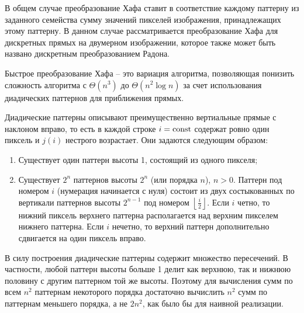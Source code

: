 

В общем случае преобразование Хафа ставит в соответствие каждому паттерну из заданного семейства сумму значений пикселей изображения, принадлежащих этому паттерну. В данном случае рассматривается преобразование Хафа для дискретных прямых на двумерном изображении, которое также может быть названо дискретным преобразованием Радона.

Быстрое преобразование Хафа -- это вариация алгоритма, позволяющая понизить сложность алгоритма с $\Theta(n^3)$ до $\Theta(n^2 \log n)$ за счет использования диадических паттернов для приближения прямых.

Диадические паттерны описывают преимущественно вертиальные прямые с наклоном вправо, то есть в каждой строке $i=\mathrm{const}$ содержат ровно один пиксель и $j(i)$ нестрого возрастает. Они задаются следующим образом:
\begin{enumerate}
\item
    Существует один паттерн высоты 1, состоящий из одного пикселя;
\item
    Существует $2^n$ паттернов высоты $2^n$ (или порядка $n$), $n > 0$. Паттерн под номером $i$ (нумерация начинается с нуля) состоит из двух состыкованных по вертикали паттернов высоты $2^{n-1}$ под номером $\left\lfloor \frac{i}{2} \right\rfloor$.
    Если $i$ четно, то нижний пиксель верхнего паттерна располагается над верхним пикселем нижнего паттерна.
    Если $i$ нечетно, то верхний паттерн дополнительно сдвигается на один пиксель вправо.
\end{enumerate}

В силу построения диадические паттерны содержит множество пересечений. В частности, любой паттерн высоты больше 1 делит как верхнюю, так и нижнюю половину с другим паттерном той же высоты. Поэтому для вычисления сумм по всем $n^2$ паттернам некоторого порядка достаточно вычислить $n^2$ сумм по паттернам меньшего порядка, а не $2n^2$, как было бы для наивной реализации.

